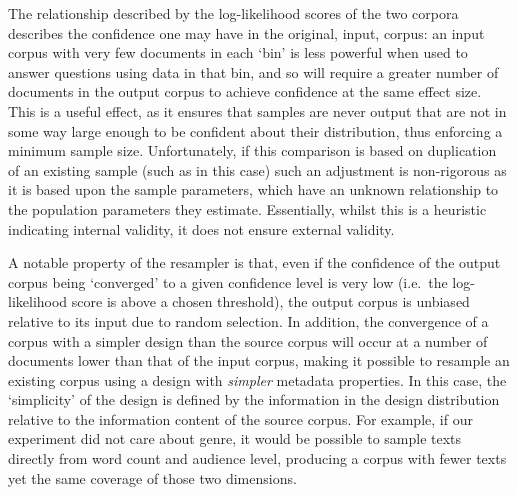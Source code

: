 













The relationship described by the log-likelihood scores of the two corpora describes the confidence one may have in the original, input, corpus: an input corpus with very few documents in each `bin' is less powerful when used to answer questions using data in that bin, and so will require a greater number of documents in the output corpus to achieve confidence at the same effect size.  This is a useful effect, as it ensures that samples are never output that are not in some way large enough to be confident about their distribution, thus enforcing a minimum sample size.  Unfortunately, if this comparison is based on duplication of an existing sample (such as in this case) such an adjustment is non-rigorous as it is based upon the sample parameters, which have an unknown relationship to the population parameters they estimate.  Essentially, whilst this is a heuristic indicating internal validity, it does not ensure external validity.

A notable property of the resampler is that, even if the confidence of the output corpus being `converged' to a given confidence level is very low (i.e.\ the log-likelihood score is above a chosen threshold), the output corpus is unbiased relative to its input due to random selection.  In addition, the convergence of a corpus with a simpler design than the source corpus will occur at a number of documents lower than that of the input corpus, making it possible to resample an existing corpus using a design with \textit{simpler} metadata properties.  In this case, the `simplicity' of the design is defined by the information in the design distribution relative to the information content of the source corpus.  For example, if our experiment did not care about genre, it would be possible to sample texts directly from word count and audience level, producing a corpus with fewer texts yet the same coverage of those two dimensions.






